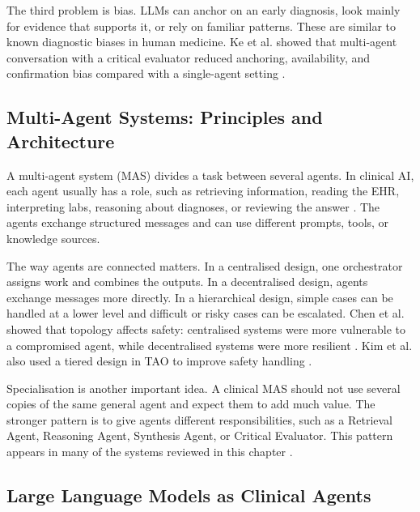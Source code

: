 The third problem is bias. LLMs can anchor on an early diagnosis, look mainly for
evidence that supports it, or rely on familiar patterns. These are similar to
known diagnostic biases in human medicine. Ke et al. showed that multi-agent
conversation with a critical evaluator reduced anchoring, availability, and
confirmation bias compared with a single-agent setting \cite{Ke2024CognitiveBias}.

\FloatBarrier
\subsection{Multi-Agent Systems: Principles and Architecture}
\label{subsec:mas_principles}

A multi-agent system (MAS) divides a task between several agents. In clinical AI,
each agent usually has a role, such as retrieving information, reading the EHR,
interpreting labs, reasoning about diagnoses, or reviewing the answer
\cite{Kim2024MDAgents}. The agents exchange structured messages and can use
different prompts, tools, or knowledge sources.

The way agents are connected matters. In a centralised design, one orchestrator
assigns work and combines the outputs. In a decentralised design, agents exchange
messages more directly. In a hierarchical design, simple cases can be handled at
a lower level and difficult or risky cases can be escalated. Chen et al. showed
that topology affects safety: centralised systems were more vulnerable to a
compromised agent, while decentralised systems were more resilient
\cite{Chen2025MedSentry}. Kim et al. also used a tiered design in TAO to improve
safety handling \cite{Kim2025TAO}.

Specialisation is another important idea. A clinical MAS should not use several
copies of the same general agent and expect them to add much value. The stronger
pattern is to give agents different responsibilities, such as a Retrieval Agent,
Reasoning Agent, Synthesis Agent, or Critical Evaluator. This pattern appears in
many of the systems reviewed in this chapter
\cite{Zhou2024ZODIAC,Yan2024ClinicalLab}.

\FloatBarrier
\subsection{Large Language Models as Clinical Agents}
\label{subsec:llm_agents}

